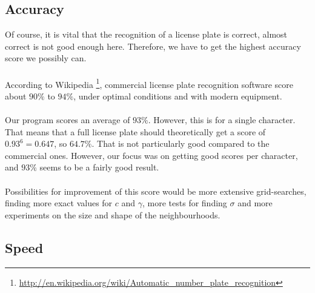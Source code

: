\documentclass[a4paper]{article}
\begin{document}
\subsection{Accuracy}

Of course, it is vital that the recognition of a license plate is correct,
almost correct is not good enough here. Therefore, we have to get the highest
accuracy score we possibly can.\\
\\ According to Wikipedia
\footnote{
\url{http://en.wikipedia.org/wiki/Automatic_number_plate_recognition}},
commercial license plate recognition software score about $90\%$ to $94\%$,
under optimal conditions and with modern equipment.\\
\\
Our program scores an average of $93\%$. However, this is for a single
character. That means that a full license plate should theoretically
get a score of $0.93^6 = 0.647$, so $64.7\%$. That is not particularly
good compared to the commercial ones. However, our focus was on getting
good scores per character, and $93\%$ seems to be a fairly good result.\\
\\
Possibilities for improvement of this score would be more extensive
grid-searches, finding more exact values for $c$ and $\gamma$, more tests
for finding $\sigma$ and more experiments on the size and shape of the
neighbourhoods.

\subsection{Speed}
\end{document}
